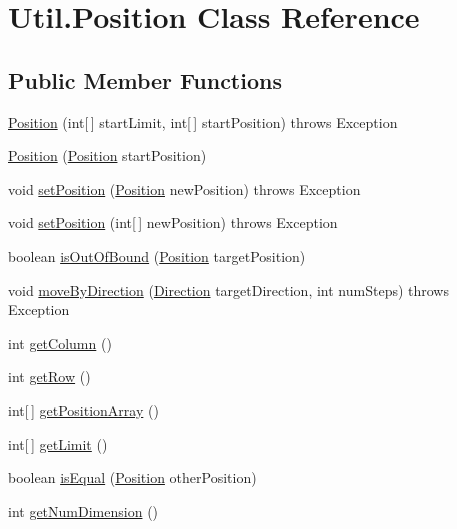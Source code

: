 \hypertarget{classUtil_1_1Position}{\section{Util.\-Position Class Reference}
\label{classUtil_1_1Position}
}
\subsection*{Public Member Functions}
\begin{DoxyCompactItemize}
\item 
\hyperlink{classUtil_1_1Position_a3d3221507de643f73d0fab607b20e347}{Position} (int\mbox{[}$\,$\mbox{]} start\-Limit, int\mbox{[}$\,$\mbox{]} start\-Position)  throws Exception 
\item 
\hyperlink{classUtil_1_1Position_ae7e3d03121824528793f53aec8545d23}{Position} (\hyperlink{classUtil_1_1Position}{Position} start\-Position)
\item 
void \hyperlink{classUtil_1_1Position_aad3684fa59219bb11bd5396a6849b372}{set\-Position} (\hyperlink{classUtil_1_1Position}{Position} new\-Position)  throws Exception
\item 
void \hyperlink{classUtil_1_1Position_a1c9b96f4cde809086723628f46eb4c94}{set\-Position} (int\mbox{[}$\,$\mbox{]} new\-Position)  throws Exception 
\item 
boolean \hyperlink{classUtil_1_1Position_aba2d90bf5a68f3270af5698a7b4876b3}{is\-Out\-Of\-Bound} (\hyperlink{classUtil_1_1Position}{Position} target\-Position)
\item 
void \hyperlink{classUtil_1_1Position_a170f73a1e2a6bb4d2d3cf132b301fea2}{move\-By\-Direction} (\hyperlink{classUtil_1_1Direction}{Direction} target\-Direction, int num\-Steps)  throws Exception
\item 
int \hyperlink{classUtil_1_1Position_a1fce53fb8f0786c8965deedb1d90ad41}{get\-Column} ()
\item 
int \hyperlink{classUtil_1_1Position_a582e48723db7f7d3aad37615e716f69e}{get\-Row} ()
\item 
int\mbox{[}$\,$\mbox{]} \hyperlink{classUtil_1_1Position_a570c27838adc08b0cb6e06f9e916d0d7}{get\-Position\-Array} ()
\item 
int\mbox{[}$\,$\mbox{]} \hyperlink{classUtil_1_1Position_a06f8180e1b836857874372dabcf6d5a9}{get\-Limit} ()
\item 
boolean \hyperlink{classUtil_1_1Position_ae730a2cd996df951618166141a790b79}{is\-Equal} (\hyperlink{classUtil_1_1Position}{Position} other\-Position)
\item 
int \hyperlink{classUtil_1_1Position_a0f7226ab6a40202983339152b5d5455d}{get\-Num\-Dimension} ()
\end{DoxyCompactItemize}


